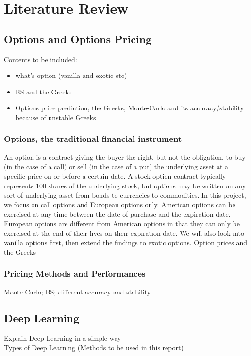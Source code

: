 \documentclass{report}
\begin{document}
\chapter{Literature Review}

\section{Options and Options Pricing}

Contents to be included:
\begin{itemize}
\item what's option (vanilla and exotic etc)
\item BS and the Greeks
\item Options price prediction, the Greeks, Monte-Carlo and its accuracy/stability because of unstable Greeks
\end{itemize}

\subsection{Options, the traditional financial instrument}
An option is a contract giving the buyer the right, but not the obligation, to buy (in the case of a call) or sell (in the case of a put) the underlying asset at a specific price on or before a certain date. A stock option contract typically represents 100 shares of the underlying stock, but options may be written on any sort of underlying asset from bonds to currencies to commodities.
In this project, we focus on call options and European options only. American options can be exercised at any time between the date of purchase and the expiration date. European options are different from American options in that they can only be exercised at the end of their lives on their expiration date.
We will also look into vanilla options first, then extend the findings to exotic options. 
Option prices and the Greeks
\subsection{Pricing Methods and Performances}
Monte Carlo; BS; different accuracy and stability

\section{Deep Learning}
Explain Deep Learning in a simple way\\
Types of Deep Learning (Methods to be used in this report)
\end{document}
